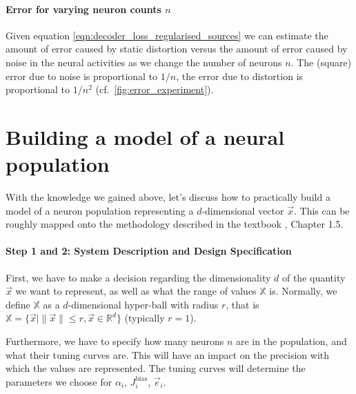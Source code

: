 \documentclass[10pt,letterpaper,oneside]{article}
\begin{document}
\paragraph{Error for varying neuron counts $n$}
Given equation \cref{eqn:decoder_loss_regularised_sources} we can estimate the amount of error caused by static distortion versus the amount of error caused by noise in the neural activities as we change the number of neurons $n$. The (square) error due to noise is proportional to $1/n$, the error due to distortion is proportional to $1/n^2$ (cf.~\cref{fig:error_experiment}).

\section{Building a model of a neural population}

With the knowledge we gained above, let's discuss how to practically build a model of a neuron population representing a $d$-dimensional vector $\vec x$. This can be roughly mapped onto the methodology described in the textbook \cite{eliasmith2003neural}, Chapter 1.5.

\paragraph{Step 1 and 2: System Description and Design Specification}
First, we have to make a decision regarding the dimensionality $d$ of the quantity $\vec x$ we want to represent, as well as what the range of values $\mathbb{X}$ is. Normally, we define $\mathbb{X}$ as a $d$-dimensional hyper-ball with radius $r$, that is $\mathbb{X} = \big\{ \vec x \mid \| \vec x \| \leq r, \vec x \in \mathbb{R}^d \big\}$ (typically $r = 1$).

Furthermore, we have to specify how many neurons $n$ are in the population, and what their tuning curves are. This will have an impact on the precision with which the values are represented. The tuning curves will determine the parameters we choose for $\alpha_i$, $J^\mathrm{bias}_i$, $\vec e_i$.
\end{document}

